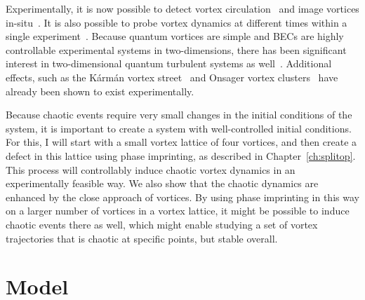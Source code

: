 Experimentally, it is now possible to detect vortex circulation~\cite{seo2017} and image vortices in-situ~\cite{wilson2015}.
It is also possible to probe vortex dynamics at different times within a single experiment~\cite{freilich2010, serafini2017}.
Because quantum vortices are simple and BECs are highly controllable experimental systems in two-dimensions, there has been significant interest in two-dimensional quantum turbulent systems as well~\cite{neely2013,shin2004}.
Additional effects, such as the K\'arm\'an vortex street~\cite{kwon2014} and Onsager vortex clusters~\cite{gauthier2018,johnstone2018} have already been shown to exist experimentally.

Because chaotic events require very small changes in the initial conditions of the system, it is important to create a system with well-controlled initial conditions.
For this, I will start with a small vortex lattice of four vortices, and then create a defect in this lattice using phase imprinting, as described in Chapter~\ref{ch:splitop}.
This process will controllably induce chaotic vortex dynamics in an experimentally feasible way.
We also show that the chaotic dynamics are enhanced by the close approach of vortices.
By using phase imprinting in this way on a larger number of vortices in a vortex lattice, it might be possible to induce chaotic events there as well, which might enable studying a set of vortex trajectories that is chaotic at specific points, but stable overall.

\section{Model}


